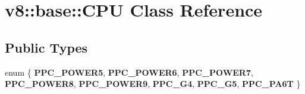 \hypertarget{classv8_1_1base_1_1CPU}{}\section{v8\+:\+:base\+:\+:C\+PU Class Reference}
\label{classv8_1_1base_1_1CPU}
\subsection*{Public Types}
\begin{DoxyCompactItemize}
\item 
\mbox{\label{classv8_1_1base_1_1CPU_a7805cb148ff43caeb0520c609ae10473}} 
enum \{ \newline
{\bfseries P\+P\+C\+\_\+\+P\+O\+W\+E\+R5}, 
{\bfseries P\+P\+C\+\_\+\+P\+O\+W\+E\+R6}, 
{\bfseries P\+P\+C\+\_\+\+P\+O\+W\+E\+R7}, 
{\bfseries P\+P\+C\+\_\+\+P\+O\+W\+E\+R8}, 
\newline
{\bfseries P\+P\+C\+\_\+\+P\+O\+W\+E\+R9}, 
{\bfseries P\+P\+C\+\_\+\+G4}, 
{\bfseries P\+P\+C\+\_\+\+G5}, 
{\bfseries P\+P\+C\+\_\+\+P\+A6T}
 \}
\end{DoxyCompactItemize}
